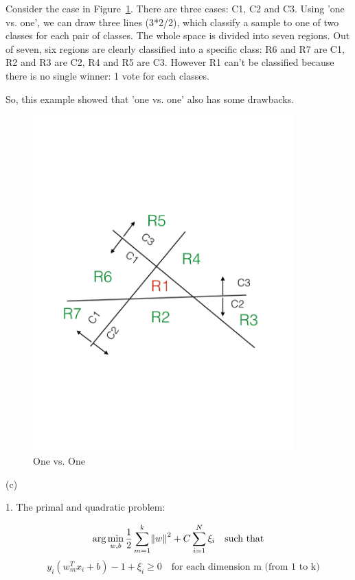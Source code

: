 \documentclass[11pt]{article}
\theoremstyle{definition}
\begin{document}
Consider the case in Figure~\ref{fig:one-one}. There are three cases: C1, C2 and C3. Using
'one vs. one', we can draw three lines (3*2/2), which classify a sample to one
of two classes for each pair of classes.  The whole space is divided into seven
regions.  Out of seven, six regions are clearly classified into a specific
class: R6 and R7 are C1, R2 and R3 are C2, R4 and R5 are C3.  However R1 can't
be classified because there is no single winner: 1 vote for each classes.

So, this example showed that 'one vs. one' also has some drawbacks.

\begin{figure}[h]
  \centering
  \includegraphics[width=10cm]{one-one}
  \caption{One vs. One}
  \label{fig:one-one}
\end{figure}

\pagebreak

(c)

1. The primal and quadratic problem:

\begin{equation*}
\arg \min_{w,b} \frac{1}{2} \sum_{m=1}^{k} \norm{w}^2 + C \sum_{i=1}^{N}\xi_i \quad \text{such that}
\end{equation*}
\begin{equation*}
\quad y_i (w_m^T x_i + b) -1 + \xi_i \ge 0 \quad \text{for each dimension m (from 1 to k)}
\end{equation*}
\end{document}
